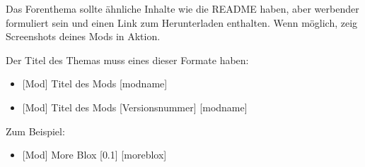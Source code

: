 Das Forenthema sollte ähnliche Inhalte wie die README haben, aber
werbender formuliert sein und einen Link zum Herunterladen enthalten.
Wenn möglich, zeig Screenshots deines Mods in Aktion.

Der Titel des Themas muss eines dieser Formate haben:

\begin{itemize}
\tightlist
\item
  {[}Mod{]} Titel des Mods {[}modname{]}
\item
  {[}Mod{]} Titel des Mods {[}Versionsnummer{]} {[}modname{]}
\end{itemize}

Zum Beispiel:

\begin{itemize}
\tightlist
\item
  {[}Mod{]} More Blox {[}0.1{]} {[}moreblox{]}
\end{itemize}
